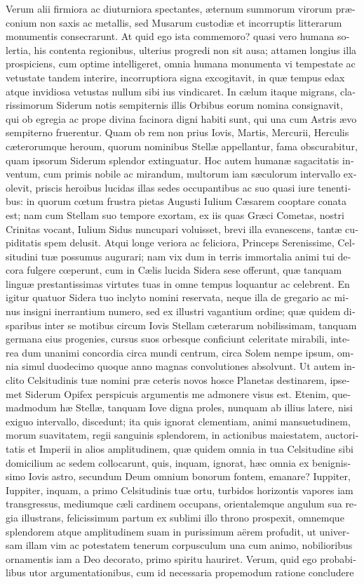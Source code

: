 \documentclass[11pt,twoside,openany]{book}
\begin{document}
\begin{otherlanguage}{latin}
Verum alii firmiora ac diuturniora spectantes, æternum summorum virorum præconium non saxis ac metallis, sed Musarum custodiæ et incorruptis litterarum monumentis consecrarunt. At quid ego ista commemoro? quasi vero humana solertia, his contenta regionibus, ulterius progredi non sit ausa; attamen longius illa prospiciens, cum optime intelligeret, omnia humana monumenta vi tempestate ac vetustate tandem interire, incorruptiora signa excogitavit, in quæ tempus edax atque invidiosa vetustas nullum sibi ius vindicaret. In cælum itaque migrans, clarissimorum Siderum notis sempiternis illis Orbibus eorum nomina consignavit, qui ob egregia ac prope divina facinora digni habiti sunt, qui una cum Astris ævo sempiterno fruerentur. Quam ob rem non prius Iovis, Martis, Mercurii, Herculis cæterorumque heroum, quorum nominibus Stellæ appellantur, fama obscurabitur, quam ipsorum Siderum splendor extinguatur. Hoc autem humanæ sagacitatis inventum, cum primis nobile ac mirandum, multorum iam sæculorum intervallo exolevit, priscis heroibus lucidas illas sedes occupantibus ac suo quasi iure tenentibus: in quorum cœtum frustra pietas Augusti Iulium Cæsarem cooptare conata est; nam cum Stellam suo tempore exortam, ex iis quas Græci Cometas, nostri Crinitas vocant, Iulium Sidus nuncupari voluisset, brevi illa evanescens, tantæ cupiditatis spem delusit. Atqui longe veriora ac feliciora, Princeps Serenissime, Celsitudini tuæ possumus augurari; nam vix dum in terris immortalia animi tui decora fulgere cœperunt, cum in Cælis lucida Sidera sese offerunt, quæ tanquam linguæ prestantissimas virtutes tuas in omne tempus loquantur ac celebrent. En igitur quatuor Sidera tuo inclyto nomini reservata, neque illa de gregario ac minus insigni inerrantium numero, sed ex illustri vagantium ordine; quæ quidem disparibus inter se motibus circum Iovis Stellam cæterarum nobilissimam, tanquam germana eius progenies, cursus suos orbesque conficiunt celeritate mirabili, interea dum unanimi concordia circa mundi centrum, circa Solem\textsc{ }nempe ipsum, omnia simul duodecimo\textsc{ }quoque anno magnas convolutiones absolvunt. Ut autem inclito Celsitudinis tuæ nomini præ ceteris novos hosce Planetas destinarem, ipsemet Siderum Opifex perspicuis argumentis me admonere visus est. Etenim, quemadmodum hæ Stellæ, tanquam Iove digna proles, nunquam ab illius latere, nisi exiguo intervallo, discedunt; ita quis ignorat clementiam, animi mansuetudinem, morum suavitatem, regii sanguinis splendorem, in actionibus maiestatem, auctoritatis et Imperii in alios amplitudinem, quæ quidem omnia in tua Celsitudine sibi domicilium ac sedem collocarunt, quis, inquam, ignorat, hæc omnia ex benignissimo Iovis astro, secundum Deum omnium bonorum fontem, emanare? Iuppiter,\textsc{ }Iuppiter, inquam, a primo Celsitudinis tuæ ortu, turbidos horizontis vapores iam transgressus, mediumque cæli cardinem occupans, orientalemque angulum sua regia illustrans, felicissimum partum ex sublimi illo throno prospexit, omnemque splendorem atque amplitudinem suam in purissimum aërem profudit, ut universam illam vim ac potestatem tenerum corpusculum una cum animo, nobilioribus ornamentis iam a Deo decorato, primo spiritu hauriret. Verum, quid ego probabilibus utor argumentationibus, cum id necessaria propemodum ratione concludere 
\end{otherlanguage}
\end{document}
